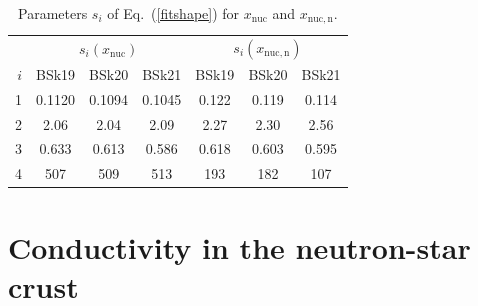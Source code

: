 \documentclass{aa}
\newcommand{\req}[1]{Eq.~(\ref{#1})}
\begin{document}
\begin{table}
\centering
\caption[]{Parameters $s_i$ of \req{fitshape} for $x_\mathrm{nuc}$ 
and $x_{\mathrm{nuc,n}}$.}
\label{tab:fitx}
\begin{tabular}{r|ccc|ccc}
\hline\hline\rule[-1.4ex]{0pt}{3.7ex}
 & \multicolumn{3}{c|}{$s_i(x_{\mathrm{nuc}})$}
  & \multicolumn{3}{c}{$s_i(x_{\mathrm{nuc,n}})$} \\
$i$ &  BSk19 & BSk20 & BSk21 &  BSk19 & BSk20 & BSk21  \\
\hline\rule{0pt}{2.2ex}
1  & 0.1120 & 0.1094 & 0.1045 & 0.122 & 0.119 & 0.114 \\
2  & 2.06 & 2.04 & 2.09 & 2.27 & 2.30 & 2.56 \\
3  & 0.633 & 0.613 & 0.586 & 0.618 & 0.603 & 0.595 \\
4  & 507 & 509 & 513 & 193 & 182 & 107 \\
\hline\hline
\end{tabular}
\end{table}

\section{Conductivity in the neutron-star crust}
\label{sect:cond}
\end{document}
